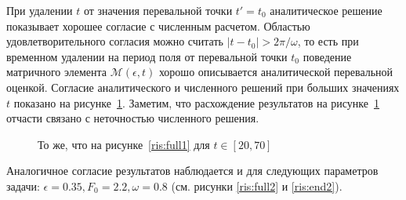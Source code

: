 \documentclass[14pt, a4paper]{article}
\numberwithin{figure}{section}
\numberwithin{equation}{section}
\newcommand{\cM}{\mathcal{M}}
\begin{document}
При удалении $t$ от значения перевальной точки $t'=t_0$ аналитическое решение показывает хорошее согласие с численным расчетом. Областью удовлетворительного согласия можно считать $|t-t_0|>2\pi/\omega$, то есть при временном удалении на период поля от перевальной точки $t_0$ поведение матричного элемента $\cM(\epsilon,t)$ хорошо описывается аналитической перевальной оценкой. Согласие аналитического и численного решений при больших значениях $t$ показано на рисунке~\ref{ris:end1}.  Заметим, что расхождение результатов на рисунке~\ref{ris:end1} отчасти связано с неточностью численного решения.

\begin{figure}[h]
	\caption{То же, что на рисунке~\ref{ris:full1} для $t\in[20, 70]$}
	\label{ris:end1}
\end{figure}

Аналогичное согласие результатов наблюдается и для следующих параметров задачи: $\epsilon = 0.35, F_0 = 2.2, \omega = 0.8$ (см. рисунки \ref{ris:full2} и \ref{ris:end2}).
\end{document}
